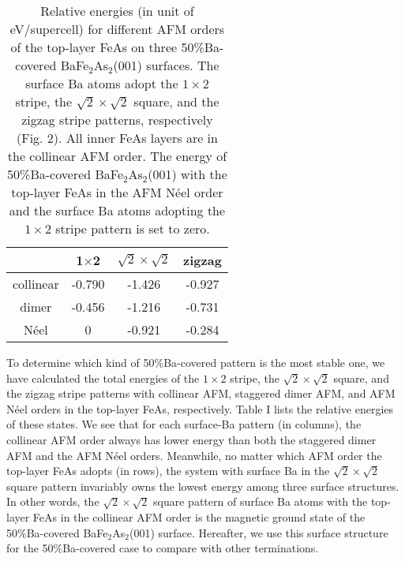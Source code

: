 \documentclass[twocolumn,aps,showpacs,prb]{revtex4-1}
\begin{document}
\begin{table}[b!]
\caption{Relative energies (in unit of eV/supercell) for different AFM orders of the top-layer FeAs on three 50\%Ba-covered BaFe$_{2}$As$_{2}$(001) surfaces. The surface Ba atoms adopt the $1\times2$ stripe, the $\sqrt{2}\times\sqrt{2}$ square, and the zigzag stripe patterns, respectively (Fig. 2). All inner FeAs layers are in the collinear AFM order. The energy of 50\%Ba-covered BaFe$_{2}$As$_{2}$(001) with the top-layer FeAs in the AFM N\'eel order and the surface Ba atoms adopting the $1\times2$ stripe pattern is set to zero.}
\begin{center}
\begin{tabular*}{8cm}{@{\extracolsep{\fill}}cccc}
\hline
\hline
 & 1$\times$2 & $\sqrt{2}\times\sqrt{2}$ & zigzag \\
\hline
collinear & -0.790  & -1.426 & -0.927 \\
dimer & -0.456 & -1.216 & -0.731  \\
N\'eel & 0 & -0.921 & -0.284 \\
\hline
\hline
\end{tabular*}
\end{center}
\end{table}

To determine which kind of 50\%Ba-covered pattern is the most stable one, we have calculated the total energies of the $1\times2$ stripe, the $\sqrt{2}\times\sqrt{2}$ square, and the zigzag stripe patterns with collinear AFM, staggered dimer AFM, and AFM N\'eel orders in the top-layer FeAs, respectively. Table I lists the relative energies of these states. We see that for each surface-Ba pattern (in columns), the collinear AFM order always has lower energy than both the staggered dimer AFM and the AFM N\'eel orders. Meanwhile, no matter which AFM order the top-layer FeAs adopts (in rows), the system with surface Ba in the $\sqrt{2}\times\sqrt{2}$ square pattern invariably owns the lowest energy among three surface structures. In other words, the $\sqrt{2}\times\sqrt{2}$ square pattern of surface Ba atoms with the top-layer FeAs in the collinear AFM order is the magnetic ground state of the 50\%Ba-covered BaFe$_{2}$As$_{2}$(001) surface. Hereafter, we use this surface structure for the 50\%Ba-covered case to compare with other terminations.
\end{document}
